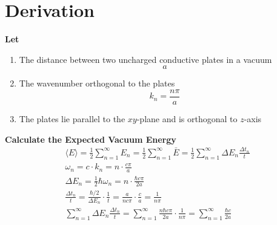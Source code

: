 \section{Derivation}
\noindent\textbf{Let}
\begin{enumerate}
    \item The distance between two uncharged conductive plates in a vacuum \[a\]
    \item The wavenumber orthogonal to the plates \[k_n = \frac{n\pi}{a}\]
    \item The plates lie parallel to the \(xy\)-plane and is orthogonal to \(z\)-axis
\end{enumerate}

\noindent\textbf{Calculate the Expected Vacuum Energy}
\begin{align*}
    &\langle E \rangle = \frac{1}{2}\sum_{n=1}^{\infty}E_n = \frac{1}{2}\sum_{n=1}^{\infty}\bar{E} = \frac{1}{2}\sum_{n=1}^{\infty}\Delta E_n\frac{\Delta t_n}{t}& \\
    &\omega_n = c \cdot k_n = n \cdot \frac{c \pi}{a}&\\
    &\Delta E_n = \frac{1}{2} \hbar \omega_n = n \cdot \frac{ \hbar c \pi}{2a}& \\
    &\frac{\Delta t_n}{t} = \frac{\hbar/2}{\Delta E_n}\cdot\frac{1}{t} = \frac{a}{n c \pi}\cdot\frac{c}{a} = \frac{1}{n \pi}&\\
    &\sum_{n=1}^{\infty} \Delta E_n \frac{\Delta t_n}{t} = \sum_{n=1}^{\infty} \frac{n \hbar c \pi}{2 a} \cdot \frac{1}{n \pi} = \sum_{n=1}^{\infty} \frac{\hbar c }{2 a}&\\
\end{align*}
